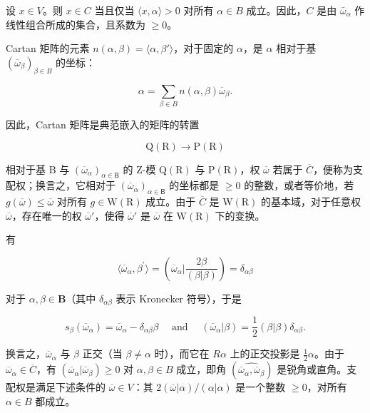 设 \(x \in V\)。则 \(x \in C\) 当且仅当 \(\langle x, \alpha \rangle > 0\) 对所有 \(\alpha \in B\) 成立。因此，\(C\) 是由 \(\bar{\omega}_{\alpha}\) 作线性组合所成的集合，且系数为 \(\geqslant 0\)。

Cartan 矩阵的元素 \(n(\alpha, \beta) = \langle \alpha, \beta' \rangle\)，对于固定的 \(\alpha\)，是 \(\alpha\) 相对于基 \((\overline{\omega}_{\beta})_{\beta \in B}\) 的坐标：

\[
\alpha = \sum_ {\beta \in B} n (\alpha , \beta) \overline {{\omega}} _ {\beta}.\tag{14}
\]

因此，Cartan 矩阵是典范嵌入的矩阵的转置

\[
\mathrm{Q} (\mathrm{R}) \rightarrow \mathrm{P} (\mathrm{R})
\]

相对于基 B 与 \((\overline{\omega}_{\alpha})_{\alpha\in\mathsf{B}}\) 的 Z-模 \(\mathrm{Q}(\mathrm{R})\) 与 \(\mathrm{P}(\mathrm{R})\)，权 \(\overline{\omega}\) 若属于 \(\overline{C}\)，便称为支配权；换言之，它相对于 \((\overline{\omega}_{\alpha})_{\alpha\in\mathsf{B}}\) 的坐标都是 \(\geqslant0\) 的整数，或者等价地，若 \(g(\overline{\omega})\leqslant\overline{\omega}\) 对所有 \(g\in\mathrm{W}(\mathrm{R})\) 成立。由于 \(\overline{C}\) 是 \(\mathrm{W(R)}\) 的基本域，对于任意权 \(\overline{\omega}\)，存在唯一的权 \(\overline{\omega}'\)，使得 \(\overline{\omega}'\) 是 \(\overline{\omega}\) 在 \(\mathrm{W(R)}\) 下的变换。

有

\[
\langle \overline {{{{\omega}}}} _ {\alpha}, \beta^ {\prime} \rangle = (\overline {{{{\omega}}}} _ {\alpha} | \frac {2 \beta}{(\beta | \beta)}) = \delta_ {\alpha \beta}
\]

对于 \(\alpha, \beta \in \mathbf{B}\)（其中 \(\delta_{\alpha\beta}\) 表示 Kronecker 符号），于是

\[
s _ {\beta} (\overline {{\omega}} _ {\alpha}) = \overline {{\omega}} _ {\alpha} - \delta_ {\alpha \beta} \beta \quad \text { and } \quad (\overline {{\omega}} _ {\alpha} | \beta) = \frac {1}{2} (\beta | \beta) \delta_ {\alpha \beta}.
\]

 换言之，\(\overline{\omega}_{\alpha}\) 与 \(\beta\) 正交（当 \(\beta \neq \alpha\) 时），而它在 \(R\alpha\) 上的正交投影是 \(\frac{1}{2}\alpha\)。由于 \(\overline{\omega}_{\alpha} \in \overline{C}\)，有 \((\overline{\omega}_{\alpha} | \overline{\omega}_{\beta}) \geqslant 0\) 对 \(\alpha, \beta \in B\) 成立，即角 \((\widehat{\overline{\omega}_{\alpha}, \overline{\omega}_{\beta}})\) 是锐角或直角。支配权是满足下述条件的 \(\overline{\omega} \in V\)：其 \(2(\overline{\omega} | \alpha)/( \alpha | \alpha)\) 是一个整数 \(\geqslant 0\)，对所有 \(\alpha \in B\) 都成立。

